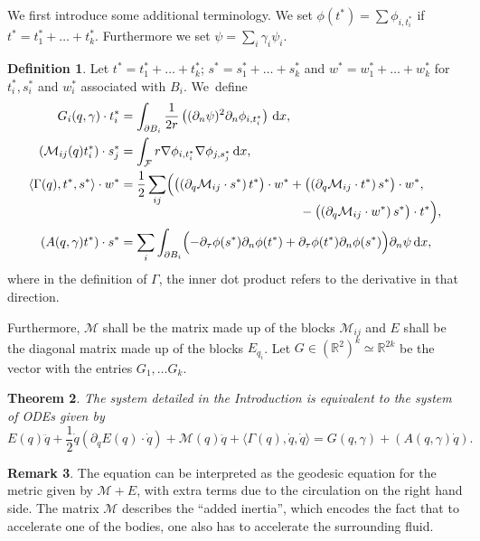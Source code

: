 \documentclass[JEP,XML,SOM,Unicode,published]{cedram}
\newtheorem{theorem}{Theorem}[subsection]
\theoremstyle{definition}
\newtheorem{definition}[theorem]{Definition}
\newtheorem{remark}[theorem]{Remark}
\newcommand\R{\mathbb{R}}
\newcommand\eq{=}
\newcommand\dd{\,\mathrm{d}}
\newcommand\dx{\dd x}
\let\de\partial
\begin{document}
We first introduce some additional terminology.
We set $\phi(t^*)=\sum \phi_{i,t_i^*}$ if $t^*=t_1^*+\dots+ t_k^*$. Furthermore we set $\psi=\sum_i\gamma_i\psi_i$.

\begin{definition}\label{main def}
Let $t^*=t_1^*+\dots+ t_k^*$; $s^*=s_1^*+\dots+ s_k^*$ and $w^*=w_1^*+\dots+w_k^*$ for $t_i^*,s_i^*$ and $w_i^*$ associated with $B_i$. We~define
\begin{align*}
G_i(q,\gamma)\cdot t_i^*&\eq\int_{\de B_i} \frac{1}{2r}\left((\de_n\psi)^2\de_n\phi_{i,t_i^*}\right)\dx,\\
(\mathcal{M}_{ij}(q)t_i^*)\cdot s_j^*&\eq\int_{\mathcal{F}}r\nabla\phi_{i,t_i^*}\nabla \phi_{j,s_j^*}\dx,\\
\langle \Gamma(q),t^*,s^*\rangle\cdot w^*&\eq \frac{1}{2}\sum_{ij}\Bigl( \bigl(\left(\de_q\mathcal{M}_{ij}\cdot s^*\right)t^*\bigr)\cdot w^*+\bigl(\left(\de_q\mathcal{M}_{ij}\cdot t^*\right)s^*\bigr)\cdot w^*,\\[-8pt]
&\hspace*{5cm}-\bigl(\left(\de_q\mathcal{M}_{ij}\cdot w^*\right)s^*\bigr)\cdot t^*\Bigr),\\
(A(q,\gamma)t^*)\cdot s^*&\eq\sum_i\int_{\de B_i}\Bigl(-\de_\tau\phi(s^*)\de_n\phi(t^*)+\de_\tau\phi(t^*)\de_n\phi(s^*)\Bigr)\de_n\psi\dx,
\end{align*}
where in the definition of $\Gamma$, the inner dot product refers to the derivative in that direction.

Furthermore, $\mathcal{M}$ shall be the matrix made up of the blocks $\mathcal{M}_{ij}$ and $E$ shall be the diagonal matrix made up of the blocks $E_{q_i}$. Let $G\in (\R^2)^k\simeq \R^{2k}$ be the vector with the entries $G_1,\dots G_k$.

\end{definition}

\begin{theorem}\label{ODEtheorem}
The system detailed in the Introduction is equivalent to the system of ODEs given by
\begin{equation}\label{MainODE}
E(q)\ddot{q}+\frac{1}{2}\dot{q}(\de_{q}E(q)\cdot\dot{q})+\mathcal{M}(q)\ddot{q}+\langle\Gamma(q),\dot{q},\dot{q}\rangle
\eq G(q,\gamma)+(A(q,\gamma)\dot{q}).
\end{equation}
\end{theorem}

\begin{remark}
The equation can be interpreted as the geodesic equation for the metric given by $\mathcal{M}+E$, with extra terms due to the circulation on the right hand side. The matrix $\mathcal{M}$ describes the ``added inertia'', which encodes the fact that to accelerate one of the bodies, one also has to accelerate the surrounding fluid.

\end{remark}
\end{document}
